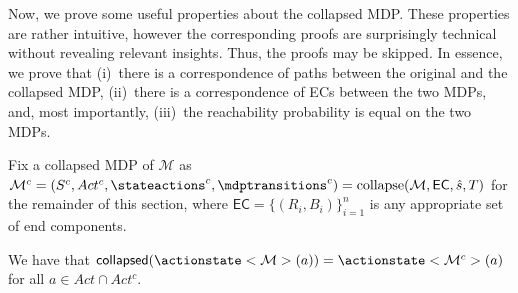 \documentclass{article}
\newcommand{\intersectionSym}{\cap}
\newcommand{\intersectionBin}{\mathbin{\intersectionSym}}
\newcommand{\intersection}{\intersectionBin}
\newcommand{\MDP}{\mathcal{M}}
\newcommand{\States}{S}
\newcommand{\initialstate}{\hat{s}}
\newcommand{\Actions}{Act}
\newcommand{\targetset}{T}
\DeclareMathOperator{\collapse}{collapse}
\newcommand{\eccollapsed}{\mathsf{collapsed}}
\newcommand{\algoecs}{\mathsf{EC}}
\begin{document}
Now, we prove some useful properties about the collapsed MDP.
These properties are rather intuitive, however the corresponding proofs are surprisingly technical without revealing relevant insights.
Thus, the proofs may be skipped.
In essence, we prove that (i)~there is a correspondence of paths between the original and the collapsed MDP, (ii)~there is a correspondence of ECs between the two MDPs, and, most importantly, (iii)~the reachability probability is equal on the two MDPs.

Fix a collapsed MDP of $\MDP$ as $\MDP^c = (\States^c, \Actions^c, \stateactions^c, \mdptransitions^c) = \collapse(\MDP, \algoecs, \initialstate, \targetset)$ for the remainder of this section, where $\algoecs = \{(R_i,B_i)\}_{i=1}^n$ is any appropriate set of end components.

\begin{lemma} \label{stm:collapse:collapse_actionstate}
	We have that $\eccollapsed(\actionstate<\MDP>(a)) = \actionstate<\MDP^c>(a)$ for all $a \in \Actions \intersection \Actions^c$.
\end{lemma}
\end{document}
